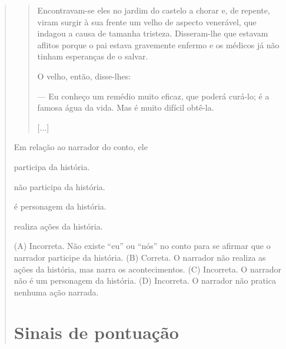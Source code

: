 \begin{boxlist}
\begin{quote}
\begin{quote}
Encontravam-se eles no jardim do castelo a chorar e, de repente, viram
surgir à sua frente um velho de aspecto venerável, que indagou a causa
de tamanha tristeza. Disseram-lhe que estavam aflitos porque o pai
estava gravemente enfermo e os médicos já não tinham esperanças de o
salvar.

O velho, então, disse-lhes:

--- Eu conheço um remédio muito eficaz, que poderá curá-lo; é a famosa
água da vida. Mas é muito difícil obtê-la.

{[}...{]}

\end{quote}

Em relação ao narrador do conto, ele

\begin{escolha}
\item participa da história.

\item não participa da história.

\item é personagem da história.

\item realiza ações da história.
\end{escolha}


(A) Incorreta. Não existe ``eu'' ou ``nós'' no conto para se afirmar
que o narrador participe da história.
(B) Correta. O narrador não realiza as ações da história, mas narra os
acontecimentos.
(C) Incorreta. O narrador não é um personagem da história.
(D) Incorreta. O narrador não pratica nenhuma ação narrada.

\chapter{Sinais de pontuação}



\end{quote}
\end{boxlist}
